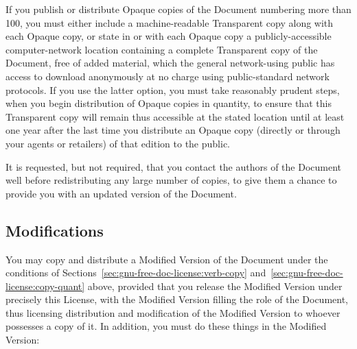 \documentclass[11pt,a4paper,oneside]{article}
\begin{document}
If you publish or distribute Opaque copies of the Document numbering
more than 100, you must either include a machine-readable Transparent
copy along with each Opaque copy, or state in or with each Opaque copy a
publicly-accessible computer-network location containing a complete
Transparent copy of the Document, free of added material, which the
general network-using public has access to download anonymously at no
charge using public-standard network protocols.  If you use the latter
option, you must take reasonably prudent steps, when you begin
distribution of Opaque copies in quantity, to ensure that this
Transparent copy will remain thus accessible at the stated location
until at least one year after the last time you distribute an Opaque
copy (directly or through your agents or retailers) of that edition to
the public.

It is requested, but not required, that you contact the authors of the
Document well before redistributing any large number of copies, to give
them a chance to provide you with an updated version of the Document.


\subsection{Modifications}
\label{sec:gnu-free-doc-license:modif}

You may copy and distribute a Modified Version of the Document under the
conditions of Sections~\ref{sec:gnu-free-doc-license:verb-copy}
and~\ref{sec:gnu-free-doc-license:copy-quant} above, provided that you
release the Modified Version under precisely this License, with the
Modified Version filling the role of the Document, thus licensing
distribution and modification of the Modified Version to whoever
possesses a copy of it.  In addition, you must do these things in the
Modified Version:
\end{document}

